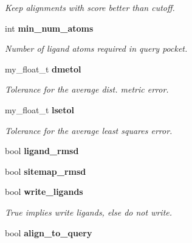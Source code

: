 \begin{CompactItemize}
\begin{CompactList}\small\item\em Keep alignments with score better than cutoff. \item\end{CompactList}\item 
int \bf{min\_\-num\_\-atoms}\label{classSimSite3D_1_1SearchParameters_b82481de1a76a7e1ef2701225f4e8e2b}

\begin{CompactList}\small\item\em Number of ligand atoms required in query pocket. \item\end{CompactList}\item 
my\_\-float\_\-t \bf{dmetol}\label{classSimSite3D_1_1SearchParameters_9afa8f1e64a425ad8e45aaf7402029c7}

\begin{CompactList}\small\item\em Tolerance for the average dist. metric error. \item\end{CompactList}\item 
my\_\-float\_\-t \bf{lsetol}\label{classSimSite3D_1_1SearchParameters_fd82cd2d31ed05774d10ab78235133f6}

\begin{CompactList}\small\item\em Tolerance for the average least squares error. \item\end{CompactList}\item 
bool \textbf{ligand\_\-rmsd}\label{classSimSite3D_1_1SearchParameters_922b10578a528a00d7b98686005636fe}

\item 
bool \textbf{sitemap\_\-rmsd}\label{classSimSite3D_1_1SearchParameters_bfcbc6418735f08eb7d0f7bd11d12a62}

\item 
bool \bf{write\_\-ligands}\label{classSimSite3D_1_1SearchParameters_8f581cefd00526d81c5db9e7f2e53dd7}

\begin{CompactList}\small\item\em True implies write ligands, else do not write. \item\end{CompactList}\item 
bool \bf{align\_\-to\_\-query}\label{classSimSite3D_1_1SearchParameters_1cb575b033f4db440a377d4ea8332929}


\end{CompactItemize}
